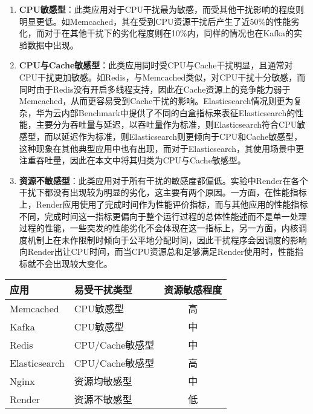 \begin{enumerate}
    
    \item \textbf{CPU敏感型}：此类应用对于CPU干扰最为敏感，而受其他干扰影响的程度则明显更低。如Memcached，其在受到CPU资源干扰后产生了近50\%的性能劣化，而对于在其他干扰下的劣化程度则在10\%内，同样的情况也在Kafka的实验数据中出现。

    \item \textbf{CPU与Cache敏感型}：此类应用同时受CPU与Cache干扰明显，且通常对CPU干扰更加敏感。如Redis，与Memcached类似，对CPU干扰十分敏感，而同时由于Redis没有开启多线程支持，因此在Cache资源上的竞争能力弱于Memcached，从而更容易受到Cache干扰的影响。Elasticsearch情况则更为复杂，华为云内部Benchmark中提供了不同的白盒指标来表征Elasticsearch的性能，主要分为吞吐量与延迟，以吞吐量作为标准，则Elasticsearch符合CPU敏感型，而以延迟作为标准，则Elasticsearch则更倾向于CPU和Cache敏感型，这种现象在其他典型应用中也有出现，而对于Elasticsearch，其使用场景中更注重吞吐量，因此在本文中将其归类为CPU与Cache敏感型。

    \item \textbf{资源不敏感型}：此类应用对于所有干扰的敏感度都偏低。实验中Render在各个干扰下都没有出现较为明显的劣化，这主要有两个原因。一方面，在性能指标上，Render应用使用了完成时间作为性能评价指标，而与其他应用的性能指标不同，完成时间这一指标更偏向于整个运行过程的总体性能述而不是单一处理过程的性能，一些突发的性能劣化不会体现在这一指标上，另一方面，内核调度机制上在未作限制时倾向于公平地分配时间，因此干扰程序会因调度的影响向Render出让CPU时间，而当CPU资源总和足够满足Render使用时，性能指标就不会出现较大变化。

\end{enumerate}


\begin{table}[H]
    \centering
    \footnotesize%
    \setlength{\tabcolsep}{20pt}%
    \renewcommand{\arraystretch}{1.25}%
    \label{tab:interf_sensitivity}
    \begin{tabular}{llc}
        \hline
        应用             & 易受干扰类型 & 资源敏感程度\\
        \hline
        Memcached       & CPU敏感型          &  高 \\
	    Kafka           & CPU敏感型          &  中 \\
        Redis           & CPU/Cache敏感型    &  中 \\
        Elasticsearch   & CPU/Cache敏感型    &  高 \\
        Nginx           & 资源均敏感型        &  中 \\
        Render          & 资源不敏感型        &  低 \\
        \hline
    \end{tabular}
\end{table}


